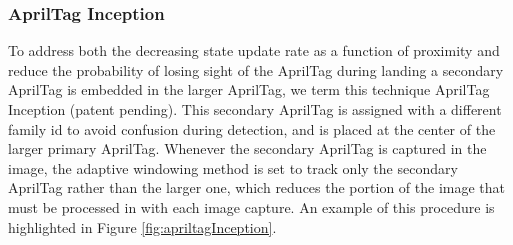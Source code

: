 \documentclass[11pt, twocolumn]{article}
\begin{document}
\subsubsection{AprilTag Inception}
To address both the decreasing state update rate as a function of proximity and reduce the probability of losing sight of the AprilTag during landing a secondary AprilTag is embedded in the larger AprilTag, we term this technique AprilTag Inception (patent pending). This secondary AprilTag is assigned with a different family id to avoid confusion during detection, and is placed at the center of the larger primary AprilTag. Whenever the secondary AprilTag is captured in the image, the adaptive windowing method is set to track only the secondary AprilTag rather than the larger one, which reduces the portion of the image that must be processed in with each image capture. An example of this procedure is highlighted in Figure \ref{fig:apriltagInception}.
 
\end{document}
